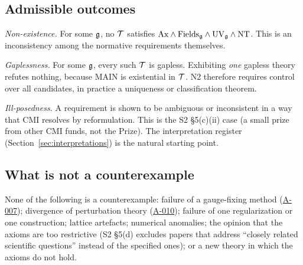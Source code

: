 \documentclass[11pt,a4paper]{article}
\newcommand{\idref}[1]{\hyperref[#1]{\textsf{#1}}}
\begin{document}
\subsection{Admissible outcomes}
\begin{description}[font=\normalfont\sffamily,leftmargin=1.1cm,labelwidth=0.9cm,align=left]
\item[N1] \emph{Non-existence.} For some $\mathfrak g$, no $\mathcal T$ satisfies $\mathrm{Ax}\wedge\mathrm{Fields}_\mathfrak g\wedge\mathrm{UV}_\mathfrak g\wedge\mathrm{NT}$. This is an inconsistency among the normative requirements themselves.
\item[N2] \emph{Gaplessness.} For some $\mathfrak g$, every such $\mathcal T$ is gapless. Exhibiting \emph{one} gapless theory refutes nothing, because MAIN is existential in $\mathcal T$. N2 therefore requires control over all candidates, in practice a uniqueness or classification theorem.
\item[N3] \emph{Ill-posedness.} A requirement is shown to be ambiguous or inconsistent in a way that CMI resolves by reformulation. This is the S2 \S5(c)(ii) case (a small prize from other CMI funds, not the Prize). The interpretation register (Section~\ref{sec:interpretations}) is the natural starting point.
\end{description}

\subsection{What is not a counterexample}
None of the following is a counterexample: failure of a gauge-fixing method (\idref{A-007}); divergence of perturbation theory (\idref{A-010}); failure of one regularization or one construction; lattice artefacts; numerical anomalies; the opinion that the axioms are too restrictive (S2 \S5(d) excludes papers that address \enquote{closely related scientific questions} instead of the specified ones); or a new theory in which the axioms do not hold.
\end{document}
